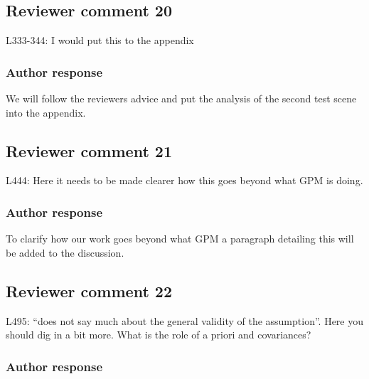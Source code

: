 \documentclass[11pt]{scrartcl}
\begin{document}
\subsection*{Reviewer comment 20}
L333-344: I would put this to the appendix

\subsubsection*{Author response}

We will follow the reviewers advice and put the analysis of the second test scene
into the appendix.

\subsection*{Reviewer comment 21}
L444: Here it needs to be made clearer how this goes beyond what GPM is doing.


\subsubsection*{Author response}

To clarify how our work goes beyond what GPM a paragraph detailing this
will be added to the discussion.

%

\subsection*{Reviewer comment 22}
L495:  “does not say much about the general validity of the assumption”.   Here you should dig in a bit more. What is the role of a priori and covariances?

\subsubsection*{Author response}
\end{document}
